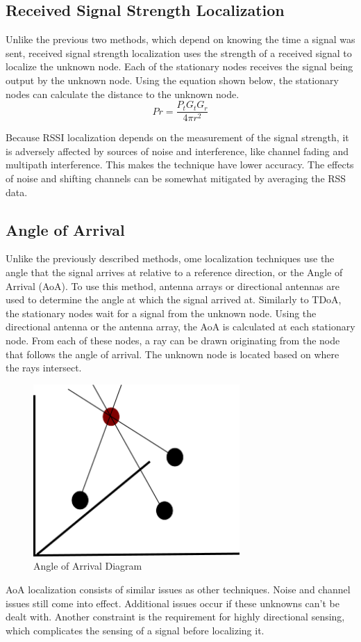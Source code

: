 \subsection{Received Signal Strength Localization}
Unlike the previous two methods, which depend on knowing the time a signal was sent, received signal strength localization uses the strength of a received signal to localize the unknown node. Each of the stationary nodes receives the signal being output by the unknown node. Using the equation shown below, the stationary nodes can calculate the distance to the unknown node.
\[Pr = \frac{P_t G_t G_r}{4πr^2} \]\par
Because RSSI localization depends on the measurement of the signal strength, it is adversely affected by sources of noise and interference, like channel fading and multipath interference. This makes the technique have lower accuracy. The effects of noise and shifting channels can be somewhat mitigated by averaging the RSS data.

\subsection{Angle of Arrival}
Unlike the previously described methods, ome localization techniques use the angle that the signal arrives at relative to a reference direction, or the Angle of Arrival (AoA). To use this method, antenna arrays or directional antennas are used to determine the angle at which the signal arrived at. Similarly to TDoA, the stationary nodes wait for a signal from the unknown node. Using the directional antenna or the antenna array, the AoA is calculated at each stationary node. From each of these nodes, a ray can be drawn originating from the node that follows the angle of arrival. The unknown node is located based on where the rays intersect.
\begin{figure}[ht]
\centering
\includegraphics[width=0.70\textwidth]{img/path4188.png}
\caption{Angle of Arrival Diagram}
\label{fig:aoa_diagram}
\end{figure}\par
AoA localization consists of similar issues as other techniques. Noise and channel issues still come into effect. Additional issues occur if these unknowns can’t be dealt with. Another constraint is the requirement for highly directional sensing, which complicates the sensing of a signal before localizing it.

